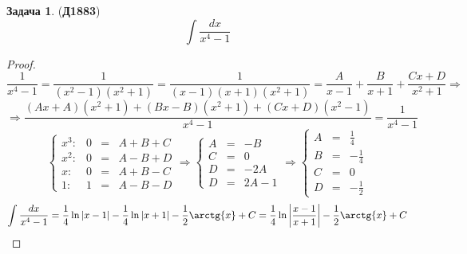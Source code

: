 \documentclass[12pt]{article}
\theoremstyle{definition}
\newtheorem{problem}{Задача}
\DeclareMathOperator{\dint}{\displaystyle\int}
\begin{document}
\begin{problem}(\textbf{Д1883})
	$$
		\dint \dfrac{dx}{x^4 -1 }
	$$
\end{problem}
\begin{proof}
	$$
		\dfrac{1}{x^4 -1 } = \dfrac{1}{(x^2 - 1)(x^2 + 1)} = \dfrac{1}{(x- 1)(x+ 1)(x^2 +1)} = \dfrac{A}{x-1} + \dfrac{B}{x+ 1} + \dfrac{Cx + D}{x^2 + 1} \Rightarrow
	$$
	$$
		\Rightarrow \dfrac{(Ax + A)(x^2 + 1) + (Bx - B)(x^2 + 1) + (Cx +D)(x^2 - 1)}{x^4 - 1} = \dfrac{1}{x^4 - 1}
	$$
	$$
		\left\{
			\begin{array}{ccccc}
				x^3 \colon& 0 & = &  A + B+C \\
				x^2 \colon& 0 & = & A -B +D\\
				x \colon& 0 & = & A + B - C\\
				1 \colon & 1 &=& A - B  - D 
			\end{array}
		\right. \Rightarrow 
		\left\{
			\begin{array}{ccc}
				A & = & -B \\[5pt]
				C & = & 0 \\[5pt]
				D & = & -2A \\[5pt]
				D & = & 2A - 1
			\end{array} 
		\right.\Rightarrow 
		\left\{
			\begin{array}{ccc}
				A & = & \tfrac{1}{4} \\[5pt]
				B & = & -\tfrac{1}{4} \\[5pt]
				C & = & 0 \\[5pt]
				D & = & -\tfrac{1}{2}
			\end{array} 
		\right.
	$$
	$$
		\dint \dfrac{dx}{x^4-1} = \dfrac{1}{4}\ln{|x-1|} - \dfrac{1}{4}\ln{|x + 1|} - \dfrac{1}{2}\arctg{x} + C = \dfrac{1}{4}\ln{\left|\dfrac{x-1}{x+1}\right|} - \dfrac{1}{2}\arctg{x} + C 
	$$
\end{proof}
\end{document}
